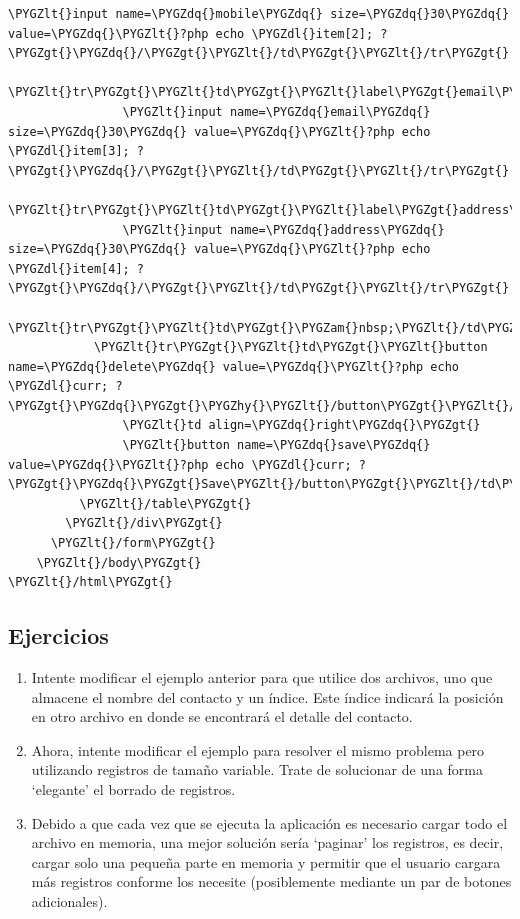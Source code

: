 \documentclass[a5paper,10pt,spanish]{sphinxmanual}
\def\PYGZam{\char`\&}
\def\PYGZlt{\char`\<}
\def\PYGZgt{\char`\>}
\def\PYGZdl{\char`\$}
\def\PYGZhy{\char`\-}
\def\PYGZdq{\char`\"}
\begin{document}
\begin{Verbatim}[commandchars=\\\{\}]
                \PYGZlt{}input name=\PYGZdq{}mobile\PYGZdq{} size=\PYGZdq{}30\PYGZdq{} value=\PYGZdq{}\PYGZlt{}?php echo \PYGZdl{}item[2]; ?\PYGZgt{}\PYGZdq{}/\PYGZgt{}\PYGZlt{}/td\PYGZgt{}\PYGZlt{}/tr\PYGZgt{}
            \PYGZlt{}tr\PYGZgt{}\PYGZlt{}td\PYGZgt{}\PYGZlt{}label\PYGZgt{}email\PYGZlt{}/label\PYGZgt{}\PYGZlt{}/td\PYGZgt{}\PYGZlt{}td\PYGZgt{}
                \PYGZlt{}input name=\PYGZdq{}email\PYGZdq{} size=\PYGZdq{}30\PYGZdq{} value=\PYGZdq{}\PYGZlt{}?php echo \PYGZdl{}item[3]; ?\PYGZgt{}\PYGZdq{}/\PYGZgt{}\PYGZlt{}/td\PYGZgt{}\PYGZlt{}/tr\PYGZgt{}
            \PYGZlt{}tr\PYGZgt{}\PYGZlt{}td\PYGZgt{}\PYGZlt{}label\PYGZgt{}address\PYGZlt{}/label\PYGZgt{}\PYGZlt{}/td\PYGZgt{}\PYGZlt{}td\PYGZgt{}
                \PYGZlt{}input name=\PYGZdq{}address\PYGZdq{} size=\PYGZdq{}30\PYGZdq{} value=\PYGZdq{}\PYGZlt{}?php echo \PYGZdl{}item[4]; ?\PYGZgt{}\PYGZdq{}/\PYGZgt{}\PYGZlt{}/td\PYGZgt{}\PYGZlt{}/tr\PYGZgt{}
            \PYGZlt{}tr\PYGZgt{}\PYGZlt{}td\PYGZgt{}\PYGZam{}nbsp;\PYGZlt{}/td\PYGZgt{}\PYGZlt{}/tr\PYGZgt{}
            \PYGZlt{}tr\PYGZgt{}\PYGZlt{}td\PYGZgt{}\PYGZlt{}button name=\PYGZdq{}delete\PYGZdq{} value=\PYGZdq{}\PYGZlt{}?php echo \PYGZdl{}curr; ?\PYGZgt{}\PYGZdq{}\PYGZgt{}\PYGZhy{}\PYGZlt{}/button\PYGZgt{}\PYGZlt{}/td\PYGZgt{}
                \PYGZlt{}td align=\PYGZdq{}right\PYGZdq{}\PYGZgt{}
                \PYGZlt{}button name=\PYGZdq{}save\PYGZdq{} value=\PYGZdq{}\PYGZlt{}?php echo \PYGZdl{}curr; ?\PYGZgt{}\PYGZdq{}\PYGZgt{}Save\PYGZlt{}/button\PYGZgt{}\PYGZlt{}/td\PYGZgt{}\PYGZlt{}/tr\PYGZgt{}
          \PYGZlt{}/table\PYGZgt{}
        \PYGZlt{}/div\PYGZgt{}
      \PYGZlt{}/form\PYGZgt{}
    \PYGZlt{}/body\PYGZgt{}
\PYGZlt{}/html\PYGZgt{}
\end{Verbatim}


\subsection{Ejercicios}
\label{Tutorial4_Archivos.md:ejercicios}\begin{enumerate}
\item {} 
Intente modificar el ejemplo anterior para que utilice dos archivos,
uno que almacene el nombre del contacto y un índice. Este índice
indicará la posición en otro archivo en donde se encontrará el
detalle del contacto.

\item {} 
Ahora, intente modificar el ejemplo para resolver el mismo problema
pero utilizando registros de tamaño variable. Trate de solucionar de
una forma `elegante' el borrado de registros.

\item {} 
Debido a que cada vez que se ejecuta la aplicación es necesario
cargar todo el archivo en memoria, una mejor solución sería `paginar'
los registros, es decir, cargar solo una pequeña parte en memoria y
permitir que el usuario cargara más registros conforme los necesite
(posiblemente mediante un par de botones adicionales).

\end{enumerate}
\end{document}
